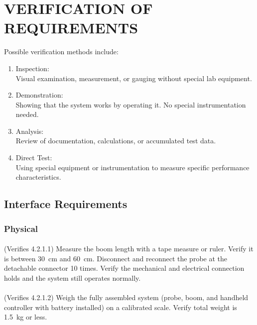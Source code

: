 \section{VERIFICATION OF REQUIREMENTS}

Possible verification methods include:
\bigskip

\begin{enumerate}
	\item Inspection:\\
	Visual examination, measurement, or gauging without special lab equipment.

	\item Demonstration:\\
	Showing that the system works by operating it.  No special instrumentation needed.

	\item Analysis:\\
	Review of documentation, calculations, or accumulated test data.

	\item Direct Test:\\
	Using special equipment or instrumentation to measure specific performance characteristics.
\end{enumerate}

\subsection{Interface Requirements}

\subsubsection{Physical}

\paragraph{}
(Verifies 4.2.1.1) Measure the boom length with a tape measure or ruler.  Verify it is between 30~cm and 60~cm.  Disconnect and reconnect the probe at the detachable connector 10 times.  Verify the mechanical and electrical connection holds and the system still operates normally.

\paragraph{}
(Verifies 4.2.1.2) Weigh the fully assembled system (probe, boom, and handheld controller with battery installed) on a calibrated scale.  Verify total weight is 1.5~kg or less.

